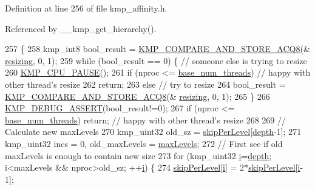 Definition at line 256 of file kmp\-\_\-affinity.\-h.



Referenced by \-\_\-\-\_\-kmp\-\_\-get\-\_\-hierarchy().


\begin{DoxyCode}
257     \{
258         kmp\_int8 bool\_result = \hyperlink{kmp__os_8h_a595d26e973de7e2012d0c93da326d08e}{KMP\_COMPARE\_AND\_STORE\_ACQ8}(&
      \hyperlink{classhierarchy__info_afa2edd0b49e3c69a50f3bbebfbd4ad77}{resizing}, 0, 1);
259         \textcolor{keywordflow}{while} (bool\_result == 0) \{ \textcolor{comment}{// someone else is trying to resize}
260             \hyperlink{kmp_8h_a0ae7084deafcd923a77e45e93058c459}{KMP\_CPU\_PAUSE}();
261             \textcolor{keywordflow}{if} (nproc <= \hyperlink{classhierarchy__info_a9055a443e8da4aefcfef1b5f1fd43b42}{base\_num\_threads})  \textcolor{comment}{// happy with other thread's resize}
262                 \textcolor{keywordflow}{return};
263             \textcolor{keywordflow}{else} \textcolor{comment}{// try to resize}
264                 bool\_result = \hyperlink{kmp__os_8h_a595d26e973de7e2012d0c93da326d08e}{KMP\_COMPARE\_AND\_STORE\_ACQ8}(&
      \hyperlink{classhierarchy__info_afa2edd0b49e3c69a50f3bbebfbd4ad77}{resizing}, 0, 1);
265         \}
266         \hyperlink{kmp__debug_8h_ad766efc30e33e28634691088e80cdf08}{KMP\_DEBUG\_ASSERT}(bool\_result!=0);
267         \textcolor{keywordflow}{if} (nproc <= \hyperlink{classhierarchy__info_a9055a443e8da4aefcfef1b5f1fd43b42}{base\_num\_threads}) \textcolor{keywordflow}{return}; \textcolor{comment}{// happy with other thread's resize}
268 
269         \textcolor{comment}{// Calculate new maxLevels}
270         kmp\_uint32 old\_sz = \hyperlink{classhierarchy__info_a80259c2cd48bb476b3eea860723e7fa8}{skipPerLevel}[\hyperlink{classhierarchy__info_aeebcad75a7d471e1b1fd37aab6216f22}{depth}-1];
271         kmp\_uint32 incs = 0, old\_maxLevels = \hyperlink{classhierarchy__info_aafbad4b89a239ea459aaef1ab4908aba}{maxLevels};
272         \textcolor{comment}{// First see if old maxLevels is enough to contain new size}
273         \textcolor{keywordflow}{for} (kmp\_uint32 \hyperlink{kmp__stub_8c_a08582ce460e3d5e1cf0b7fea017d608e}{i}=\hyperlink{classhierarchy__info_aeebcad75a7d471e1b1fd37aab6216f22}{depth}; i<maxLevels && nproc>old\_sz; ++\hyperlink{kmp__stub_8c_a08582ce460e3d5e1cf0b7fea017d608e}{i}) \{
274             \hyperlink{classhierarchy__info_a80259c2cd48bb476b3eea860723e7fa8}{skipPerLevel}[\hyperlink{kmp__stub_8c_a08582ce460e3d5e1cf0b7fea017d608e}{i}] = 2*\hyperlink{classhierarchy__info_a80259c2cd48bb476b3eea860723e7fa8}{skipPerLevel}[\hyperlink{kmp__stub_8c_a08582ce460e3d5e1cf0b7fea017d608e}{i}-1];

\end{DoxyCode}
